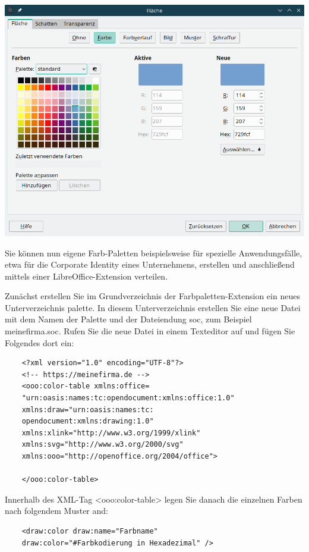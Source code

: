 \documentclass[12pt,a4paper,titlepage]{book}
\begin{document}
\begin{center}
	\captionsetup{type=figure}
	\includegraphics[width=0.9\linewidth]{pics/libo24_2_dialog_flaeche}
	\label{fig:dialog_flaeche}
\end{center}

Sie können nun eigene Farb-Paletten beispielsweise für spezielle Anwendungsfälle, etwa für die Corporate Identity eines Unternehmens, erstellen und anschließend mittels einer LibreOffice-Extension verteilen.

Zunächst erstellen Sie im Grundverzeichnis der Farbpaletten-Extension ein neues Unterverzeichnis \glqq palette\grqq. In diesem Unterverzeichnis erstellen Sie eine neue Datei mit dem Namen der Palette und der Dateiendung \glqq soc\grqq, zum Beispiel \glqq meinefirma.soc\grqq. Rufen Sie die neue Datei in einem Texteditor auf und fügen Sie Folgendes dort ein:

\begin{lstlisting}
	<?xml version="1.0" encoding="UTF-8"?>
	<!-- https://meinefirma.de -->
	<ooo:color-table xmlns:office=
	"urn:oasis:names:tc:opendocument:xmlns:office:1.0"
	xmlns:draw="urn:oasis:names:tc:
	opendocument:xmlns:drawing:1.0"
	xmlns:xlink="http://www.w3.org/1999/xlink"
	xmlns:svg="http://www.w3.org/2000/svg"
	xmlns:ooo="http://openoffice.org/2004/office">
	
	</ooo:color-table>
\end{lstlisting}

Innerhalb des XML-Tag <ooo:color-table> legen Sie danach die einzelnen Farben nach folgendem Muster and:

\begin{lstlisting}
	<draw:color draw:name="Farbname" 
	draw:color="#Farbkodierung in Hexadezimal" />
\end{lstlisting}
\end{document}
